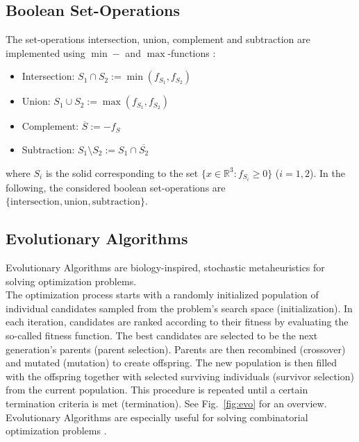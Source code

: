 
\subsection{Boolean Set-Operations}
The set-operations intersection, union, complement and subtraction are implemented using $\min-$ and $\max$-functions \cite{ricci197constgeo}: 
\begin{itemize}
	\item Intersection: $S_1 \cap S_2 := \min(f_{S_1}, f_{S_2})$
	\item Union: $S_1 \cup S_2 := \max(f_{S_1}, f_{S_2})$
	\item Complement: $\overline{S} := -f_S$ %
	\item Subtraction: $S_1 \setminus S_2 := S_1 \cap \overline{S_2}$%
\end{itemize}
where $S_i$ is the solid corresponding to the set $\{x \in \mathbb{R}^3: f_{S_i} \geq 0\}$ ($i=1,2$).
In the following, the considered boolean set-operations are $\{\text{intersection}, \text{union}, \text{subtraction}\}$.
\subsection{Evolutionary Algorithms} 
Evolutionary Algorithms are biology-inspired, stochastic metaheuristics for solving optimization problems.
\\
The optimization process starts with a randomly initialized population of individual candidates sampled from the problem's search space (initialization).
In each iteration, candidates are ranked according to their fitness by evaluating the so-called fitness function.
The best candidates are selected to be the next generation's parents (parent selection).
Parents are then recombined (crossover) and mutated (mutation) to create offspring. 
The new population is then filled with the offspring together with selected surviving individuals (survivor selection) from the current population.
This procedure is repeated until a certain termination criteria is met (termination). 
See Fig.~\ref{fig:evo} for an overview.
\\
Evolutionary Algorithms are especially useful for solving combinatorial optimization problems \cite{eiben2003introduction}.

